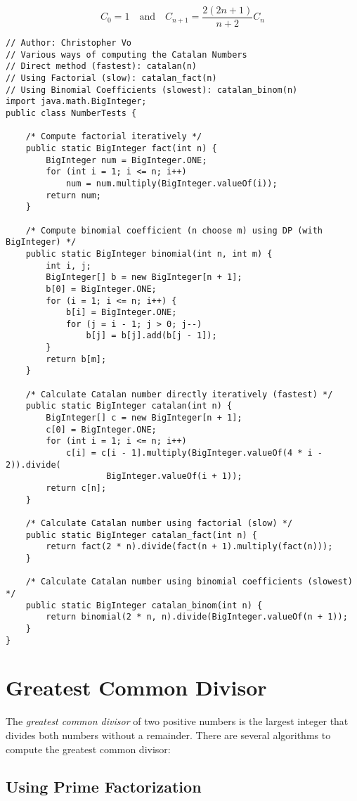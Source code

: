 \[C_0 = 1 \quad \mbox{and} \quad C_{n+1}=\dfrac{2(2n+1)}{n+2}C_n\]

\lstset{
	language=java,
	tabsize=4,
	basicstyle=\footnotesize,
}
\begin{lstlisting}
// Author: Christopher Vo
// Various ways of computing the Catalan Numbers
// Direct method (fastest): catalan(n)
// Using Factorial (slow): catalan_fact(n)
// Using Binomial Coefficients (slowest): catalan_binom(n)
import java.math.BigInteger;
public class NumberTests {

	/* Compute factorial iteratively */
	public static BigInteger fact(int n) {
		BigInteger num = BigInteger.ONE;
		for (int i = 1; i <= n; i++)
			num = num.multiply(BigInteger.valueOf(i));
		return num;
	}

	/* Compute binomial coefficient (n choose m) using DP (with BigInteger) */
	public static BigInteger binomial(int n, int m) {
		int i, j;
		BigInteger[] b = new BigInteger[n + 1];
		b[0] = BigInteger.ONE;
		for (i = 1; i <= n; i++) {
			b[i] = BigInteger.ONE;
			for (j = i - 1; j > 0; j--)
				b[j] = b[j].add(b[j - 1]);
		}
		return b[m];
	}

	/* Calculate Catalan number directly iteratively (fastest) */
	public static BigInteger catalan(int n) {
		BigInteger[] c = new BigInteger[n + 1];
		c[0] = BigInteger.ONE;
		for (int i = 1; i <= n; i++)
			c[i] = c[i - 1].multiply(BigInteger.valueOf(4 * i - 2)).divide(
					BigInteger.valueOf(i + 1));
		return c[n];
	}

	/* Calculate Catalan number using factorial (slow) */
	public static BigInteger catalan_fact(int n) {
		return fact(2 * n).divide(fact(n + 1).multiply(fact(n)));
	}

	/* Calculate Catalan number using binomial coefficients (slowest) */
	public static BigInteger catalan_binom(int n) {
		return binomial(2 * n, n).divide(BigInteger.valueOf(n + 1));
	}
}
\end{lstlisting}

\section{Greatest Common Divisor}
The {\em greatest common divisor} of two positive numbers is the largest integer that divides both numbers without a remainder. There are several algorithms to compute the greatest common divisor:

\subsection{Using Prime Factorization}

